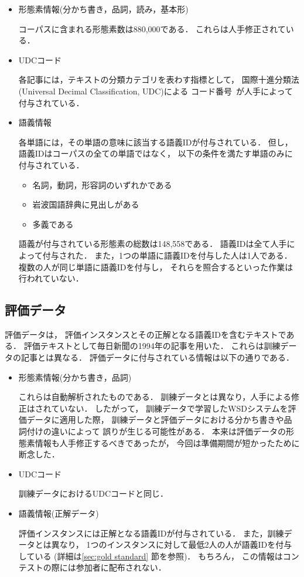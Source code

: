 \begin{itemize}
\item 形態素情報(分かち書き，品詞，読み，基本形)

  コーパスに含まれる形態素数は880,000である．
  これらは人手修正されている．

\item UDCコード

  各記事には，テキストの分類カテゴリを表わす指標として，
  国際十進分類法(Universal Decimal Classification, UDC)による
  コード番号~\cite{infosta:94:a}が人手によって付与されている．

\item 語義情報

  各単語には，その単語の意味に該当する語義IDが付与されている．
  但し，語義IDはコーパスの全ての単語ではなく，
  以下の条件を満たす単語のみに付与されている．
  \begin{itemize}
  \item 名詞，動詞，形容詞のいずれかである
  \item 岩波国語辞典に見出しがある
  \item 多義である
  \end{itemize}
  語義が付与されている形態素の総数は148,558である．
  語義IDは全て人手によって付与された．
  また，1つの単語に語義IDを付与した人は1人である．
  複数の人が同じ単語に語義IDを付与し，
  それらを照合するといった作業は行われていない．
\end{itemize}

\subsection{評価データ}
\label{sec:eval data}

評価データは，
評価インスタンスとその正解となる語義IDを含むテキストである．
評価テキストとして毎日新聞の1994年の記事を用いた．
これらは訓練データの記事とは異なる．
評価データに付与されている情報は以下の通りである．

\begin{itemize}
\item 形態素情報(分かち書き，品詞)

  これらは自動解析されたものである．
  訓練データとは異なり，人手による修正はされていない．
  したがって，
  訓練データで学習したWSDシステムを評価データに適用した際，
  訓練データと評価データにおける分かち書きや品詞付けの違いによって
  誤りが生じる可能性がある．
  本来は評価データの形態素情報も人手修正するべきであったが，
  今回は準備期間が短かったために断念した．

\item UDCコード

  訓練データにおけるUDCコードと同じ．

\item 語義情報(正解データ)

  評価インスタンスには正解となる語義IDが付与されている．
  また，訓練データとは異なり，
  1つのインスタンスに対して最低2人の人が語義IDを付与している
  (詳細は\ref{sec:gold standard} 節を参照)．
  もちろん，
  この情報はコンテストの際には参加者に配布されない．
\end{itemize}

